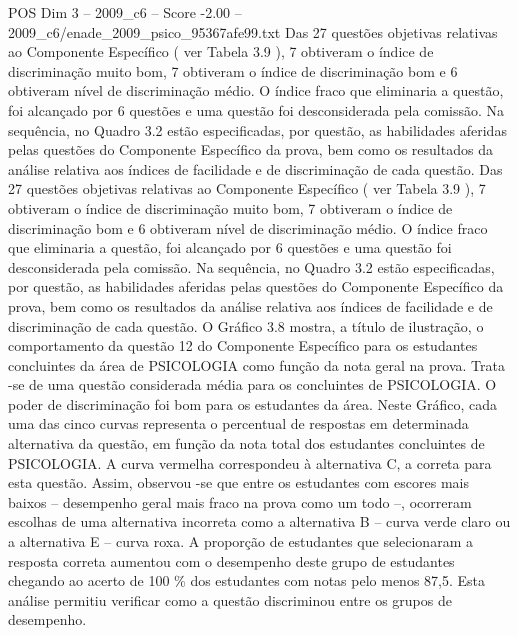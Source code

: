 \begin{textsample}{POS Dim 3 – 2009\_c6 – Score -2.00 – 2009\_c6/enade\_2009\_psico\_95367afe99.txt}
Das 27 questões objetivas relativas ao Componente Específico ( ver Tabela 3.9 ), 7 obtiveram o índice de discriminação muito bom, 7 obtiveram o índice de discriminação bom e 6 obtiveram nível de discriminação médio.
O índice fraco que eliminaria a questão, foi alcançado por 6 questões e uma questão foi desconsiderada pela comissão.
Na sequência, no Quadro 3.2 estão especificadas, por questão, as habilidades aferidas pelas questões do Componente Específico da prova, bem como os resultados da análise relativa aos índices de facilidade e de discriminação de cada questão.
Das 27 questões objetivas relativas ao Componente Específico ( ver Tabela 3.9 ), 7 obtiveram o índice de discriminação muito bom, 7 obtiveram o índice de discriminação bom e 6 obtiveram nível de discriminação médio.
O índice fraco que eliminaria a questão, foi alcançado por 6 questões e uma questão foi desconsiderada pela comissão.
Na sequência, no Quadro 3.2 estão especificadas, por questão, as habilidades aferidas pelas questões do Componente Específico da prova, bem como os resultados da análise relativa aos índices de facilidade e de discriminação de cada questão.
O Gráfico 3.8 mostra, a título de ilustração, o comportamento da questão 12 do Componente Específico para os estudantes concluintes da área de PSICOLOGIA como função da nota geral na prova.
Trata -se de uma questão considerada média para os concluintes de PSICOLOGIA.
O poder de discriminação foi bom para os estudantes da área.
Neste Gráfico, cada uma das cinco curvas representa o percentual de respostas em determinada alternativa da questão, em função da nota total dos estudantes concluintes de PSICOLOGIA.
A curva vermelha correspondeu à alternativa C, a correta para esta questão.
Assim, observou -se que entre os estudantes com escores mais baixos – desempenho geral mais fraco na prova como um todo –, ocorreram escolhas de uma alternativa incorreta como a alternativa B – curva verde claro ou a alternativa E – curva roxa.
A proporção de estudantes que selecionaram a resposta correta aumentou com o desempenho deste grupo de estudantes chegando ao acerto de 100 \% dos estudantes com notas pelo menos 87,5.
Esta análise permitiu verificar como a questão discriminou entre os grupos de desempenho.

\end{textsample}
